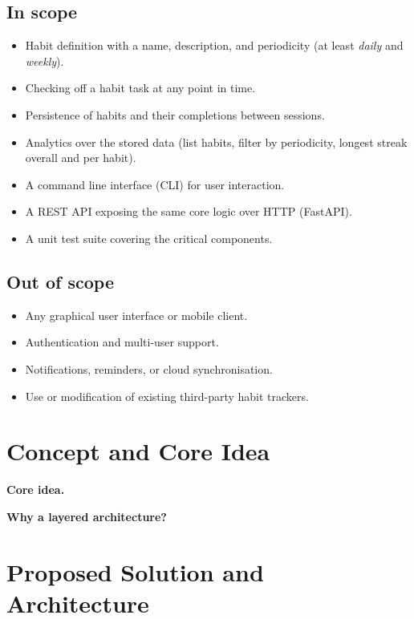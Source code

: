 \documentclass[11pt,a4paper]{article}
\begin{document}
\subsection*{In scope}
\begin{itemize}
  \item Habit definition with a name, description, and periodicity
        (at least \emph{daily} and \emph{weekly}).
  \item Checking off a habit task at any point in time.
  \item Persistence of habits and their completions between sessions.
  \item Analytics over the stored data (list habits, filter by periodicity,
        longest streak overall and per habit).
  \item A command line interface (CLI) for user interaction.
  \item A REST API exposing the same core logic over HTTP (FastAPI).
  \item A unit test suite covering the critical components.
\end{itemize}

\subsection*{Out of scope}
\begin{itemize}
  \item Any graphical user interface or mobile client.
  \item Authentication and multi-user support.
  \item Notifications, reminders, or cloud synchronisation.
  \item Use or modification of existing third-party habit trackers.
\end{itemize}

\section{Concept and Core Idea}

\noindent


\medskip
\noindent
\textbf{Core idea.} 

\medskip
\noindent
\textbf{Why a layered architecture?} 

\section{Proposed Solution and Architecture}
\end{document}
